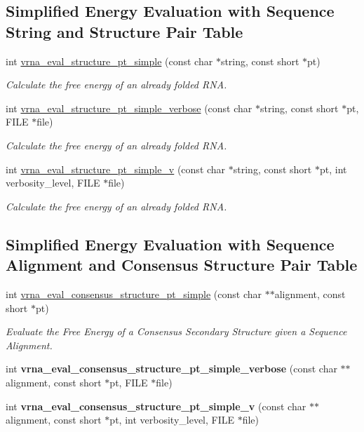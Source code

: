 \subsection*{Simplified Energy Evaluation with Sequence String and Structure Pair Table}
\begin{DoxyCompactItemize}
\item 
int \hyperlink{group__eval_ga0bba59b4d6e53461088666ff4aece7b0}{vrna\+\_\+eval\+\_\+structure\+\_\+pt\+\_\+simple} (const char $\ast$string, const short $\ast$pt)
\begin{DoxyCompactList}\small\item\em Calculate the free energy of an already folded R\+NA. \end{DoxyCompactList}\item 
int \hyperlink{group__eval_ga76e152ee9a02be23da14cdddf52b4e44}{vrna\+\_\+eval\+\_\+structure\+\_\+pt\+\_\+simple\+\_\+verbose} (const char $\ast$string, const short $\ast$pt, F\+I\+LE $\ast$file)
\begin{DoxyCompactList}\small\item\em Calculate the free energy of an already folded R\+NA. \end{DoxyCompactList}\item 
int \hyperlink{group__eval_gac40b813d35289da9816d0c1eec94faa5}{vrna\+\_\+eval\+\_\+structure\+\_\+pt\+\_\+simple\+\_\+v} (const char $\ast$string, const short $\ast$pt, int verbosity\+\_\+level, F\+I\+LE $\ast$file)
\begin{DoxyCompactList}\small\item\em Calculate the free energy of an already folded R\+NA. \end{DoxyCompactList}\end{DoxyCompactItemize}
\subsection*{Simplified Energy Evaluation with Sequence Alignment and Consensus Structure Pair Table}
\begin{DoxyCompactItemize}
\item 
int \hyperlink{group__eval_gabbb4d2a7aa324ec9cce8f47ce61ab8af}{vrna\+\_\+eval\+\_\+consensus\+\_\+structure\+\_\+pt\+\_\+simple} (const char $\ast$$\ast$alignment, const short $\ast$pt)
\begin{DoxyCompactList}\small\item\em Evaluate the Free Energy of a Consensus Secondary Structure given a Sequence Alignment. \end{DoxyCompactList}\item 
\mbox{\label{group__eval_ga2769e4369d023ad2d5c5f4d2ee825c23}} 
int {\bfseries vrna\+\_\+eval\+\_\+consensus\+\_\+structure\+\_\+pt\+\_\+simple\+\_\+verbose} (const char $\ast$$\ast$alignment, const short $\ast$pt, F\+I\+LE $\ast$file)
\item 
\mbox{\label{group__eval_gaf2d227b3d54bf9b693a3df52faf5e2e4}} 
int {\bfseries vrna\+\_\+eval\+\_\+consensus\+\_\+structure\+\_\+pt\+\_\+simple\+\_\+v} (const char $\ast$$\ast$alignment, const short $\ast$pt, int verbosity\+\_\+level, F\+I\+LE $\ast$file)
\end{DoxyCompactItemize}
